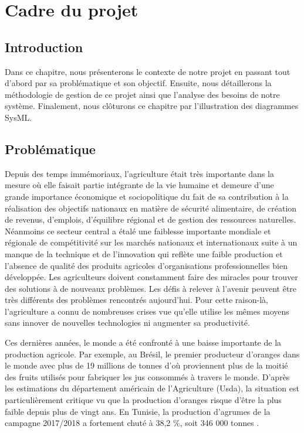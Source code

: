 
\chapter{ Cadre du projet }
\clearpage


\section{Introduction }
Dans ce chapitre, nous présenterons le contexte de notre projet en passant tout d'abord par sa  problématique et son objectif. Ensuite, nous détaillerons la méthodologie de gestion de ce projet ainsi que l'analyse des besoins de notre système. Finalement, nous clôturons ce chapitre par l'illustration des diagrammes SysML.

\section{Problématique }
Depuis des temps immémoriaux, l'agriculture était très importante dans la mesure où elle faisait partie intégrante de la vie humaine et demeure d'une grande importance économique et sociopolitique du fait de sa contribution à la réalisation des objectifs nationaux en matière de sécurité alimentaire, de création de revenus, d'emplois, d'équilibre régional et de gestion des ressources naturelles. Néanmoins ce secteur central a étalé une faiblesse importante mondiale et régionale de compétitivité sur les marchés nationaux et internationaux suite à un manque de la technique et de l'innovation qui reflète une faible production et l'absence de qualité des produits agricoles d'organisations professionnelles bien développée. Les agriculteurs doivent constamment faire des miracles pour trouver des solutions à de nouveaux problèmes. Les défis à relever à l'avenir peuvent être très différents des problèmes rencontrés aujourd'hui. Pour cette raison-là, l'agriculture a connu de nombreuses crises vue qu'elle utilise les mêmes moyens sans innover de nouvelles technologies ni augmenter sa productivité.

Ces dernières années, le monde a été confronté à une baisse importante de la production agricole. Par exemple, au Brésil, le premier producteur d'oranges dans le monde avec plus de 19 millions de tonnes d'où proviennent plus de la moitié des fruits utilisés pour fabriquer les jus consommés à travers le monde. D'après les estimations du département américain de l'Agriculture (Usda), la situation est particulièrement critique vu que la production d'oranges risque d'être la plus faible depuis plus de vingt ans. En Tunisie, la production d'agrumes de la campagne 2017/2018 a fortement chuté à 38,2 \%, soit 346 000 tonnes \cite{onagri2017/2018}.

